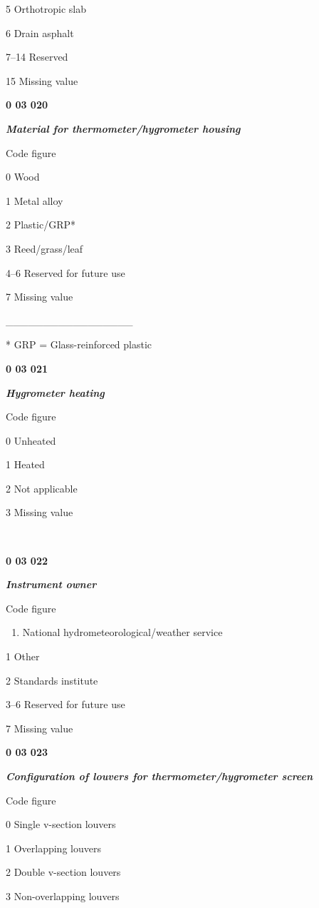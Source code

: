 5 Orthotropic slab

6 Drain asphalt

7--14 Reserved

15 Missing value

\textbf{0 03 020}

\emph{\textbf{Material for thermometer/hygrometer housing}}

Code figure

0 Wood

1 Metal alloy

2 Plastic/GRP*

3 Reed/grass/leaf

4--6 Reserved for future use

7 Missing value

\_\_\_\_\_\_\_\_\_\_\_\_\_\_\_\_\_

* GRP = Glass-reinforced plastic

\textbf{0 03 021}

\emph{\textbf{Hygrometer heating}}

Code figure

0 Unheated

1 Heated

2 Not applicable

3 Missing value

\textbf{\\
}

\textbf{0 03 022}

\emph{\textbf{Instrument owner}}

Code figure

\begin{enumerate}
\def\labelenumi{\arabic{enumi}.}
\item
  National hydrometeorological/weather service
\end{enumerate}

1 Other

2 Standards institute

3--6 Reserved for future use

7 Missing value

\textbf{0 03 023}

\emph{\textbf{Configuration of louvers for thermometer/hygrometer screen}}

Code figure

0 Single v-section louvers

1 Overlapping louvers

2 Double v-section louvers

3 Non-overlapping louvers

